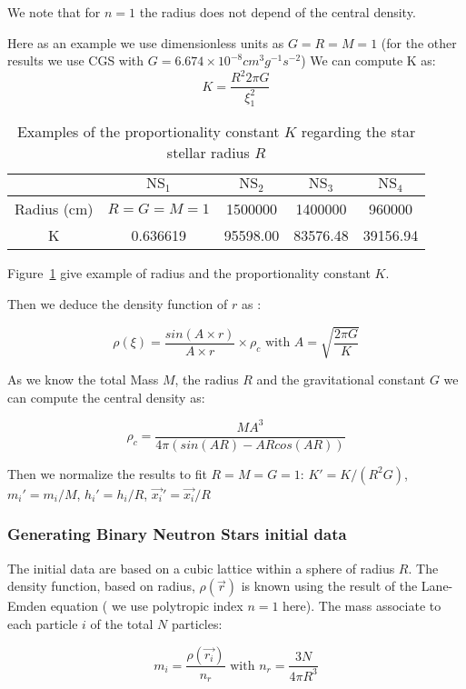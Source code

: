 We note that for $n=1$ the radius does not depend of the central density.

Here as an example we use dimensionless units as $G=R=M=1$ (for the other results we use CGS with $G = 6.674 \times 10^{-8} cm^3g^{-1}s^{-2}$) 
We can compute K as: 
\begin{equation}
\label{eq:constant}
K = \frac{R^2  2 \pi G}{\xi_1^2}
\end{equation}
%
\begin{table}[t!]
\centering
\begin{tabular}{|c|c|c|c|c|}
\hline
 & $\mbox{NS}_1$ & $\mbox{NS}_2$ & $\mbox{NS}_3$ & $\mbox{NS}_4$ \\ 
\hline 
Radius (cm) & $R=G=M=1$ & 1500000 & 1400000 & 960000 \\ 
\hline 
K & 0.636619 & 95598.00 & 83576.48 & 39156.94\\ 
\hline 
\end{tabular}
\caption{Examples of the proportionality constant $K$ regarding the star stellar radius $R$}
\label{tab:example_radius_k}
\end{table} 
Figure~\ref{tab:example_radius_k} give example of radius and the proportionality constant $K$.


Then we deduce the density function of $r$ as :

$$\rho(\xi) = \frac{sin(A\times r)}{A \times r} \times \rho_c \mbox{ with } A = \sqrt{\frac{2\pi G}{K}}
$$

As we know the total Mass $M$, the radius $R$ and the gravitational constant $G$ we can compute the central density as: 

$$ \rho_c = \frac{M A^3}{4 \pi (sin(AR)-ARcos(AR)) } $$

Then we normalize the results to fit $R = M = G = 1$: $K' = K/(R^2G) $, $m_i' = m_i/M $, $h_i' = h_i / R$, $\vec{x_i}' = \vec{x_i}/R$ 

\subsubsection{Generating Binary Neutron Stars initial data}
\label{sec:equi}

The initial data are based on a cubic lattice within a sphere of radius $R$.
The density function, based on radius, $\rho(\vec{r})$ is known using the result of the Lane-Emden equation ( we use polytropic index $n = 1$ here). 
The mass associate to each particle $i$ of the total $N$ particles: 

$$ m_i = \frac{\rho(\vec{r_i})}{n_r} \mbox{ with } n_r = \frac{3N}{4 \pi R^3}$$ 


